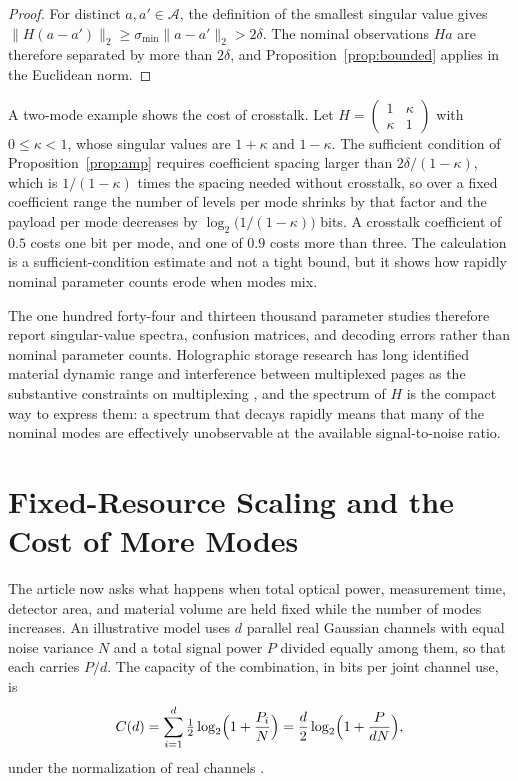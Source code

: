 \begin{proof}
For distinct $a,a'\in\mathcal A$, the definition of the smallest singular value gives $\|H(a-a')\|_2\ge\sigma_{\min}\|a-a'\|_2>2\delta$. The nominal observations $Ha$ are therefore separated by more than $2\delta$, and Proposition~\ref{prop:bounded} applies in the Euclidean norm.
\end{proof}

A two-mode example shows the cost of crosstalk. Let $H=\begin{pmatrix}1&\kappa\\ \kappa&1\end{pmatrix}$ with $0\le\kappa<1$, whose singular values are $1+\kappa$ and $1-\kappa$. The sufficient condition of Proposition~\ref{prop:amp} requires coefficient spacing larger than $2\delta/(1-\kappa)$, which is $1/(1-\kappa)$ times the spacing needed without crosstalk, so over a fixed coefficient range the number of levels per mode shrinks by that factor and the payload per mode decreases by $\log_2\bigl(1/(1-\kappa)\bigr)$ bits. A crosstalk coefficient of $0.5$ costs one bit per mode, and one of $0.9$ costs more than three. The calculation is a sufficient-condition estimate and not a tight bound, but it shows how rapidly nominal parameter counts erode when modes mix.

The one hundred forty-four and thirteen thousand parameter studies therefore report singular-value spectra, confusion matrices, and decoding errors rather than nominal parameter counts. Holographic storage research has long identified material dynamic range and interference between multiplexed pages as the substantive constraints on multiplexing \cite{coufal2000,cheriere2025}, and the spectrum of $H$ is the compact way to express them: a spectrum that decays rapidly means that many of the nominal modes are effectively unobservable at the available signal-to-noise ratio.

\section{Fixed-Resource Scaling and the Cost of More Modes}\label{sec:fixed}

The article now asks what happens when total optical power, measurement time, detector area, and material volume are held fixed while the number of modes increases. An illustrative model uses $d$ parallel real Gaussian channels with equal noise variance $N$ and a total signal power $P$ divided equally among them, so that each carries $P/d$. The capacity of the combination, in bits per joint channel use, is
\begin{equation}\label{eq:gauss}
C(d)=\sum_{i=1}^{d}\tfrac12\log_2\Bigl(1+\frac{P_i}{N}\Bigr)=\frac d2\log_2\Bigl(1+\frac{P}{dN}\Bigr),
\end{equation}
under the normalization of real channels \cite{shannon1948,cover2006}.

